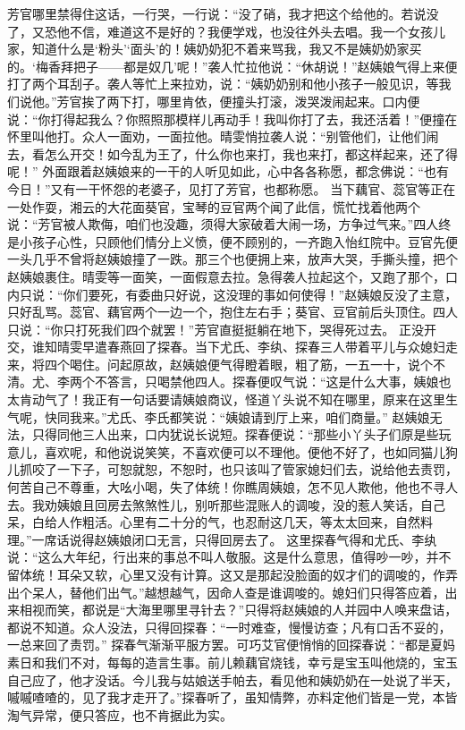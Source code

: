 \documentclass[12pt,oneside]{book}
\begin{document}
芳官哪里禁得住这话，一行哭，一行说：“没了硝，我才把这个给他的。若说没了，又恐他不信，难道这不是好的？我便学戏，也没往外头去唱。我一个女孩儿家，知道什么是‘粉头’‘面头’的！姨奶奶犯不着来骂我，我又不是姨奶奶家买的。‘梅香拜把子——都是奴几’呢！”袭人忙拉他说：“休胡说！”赵姨娘气得上来便打了两个耳刮子。袭人等忙上来拉劝，说：“姨奶奶别和他小孩子一般见识，等我们说他。”芳官挨了两下打，哪里肯依，便撞头打滚，泼哭泼闹起来。口内便说：“你打得起我么？你照照那模样儿再动手！我叫你打了去，我还活着！”便撞在怀里叫他打。众人一面劝，一面拉他。晴雯悄拉袭人说：“别管他们，让他们闹去，看怎么开交！如今乱为王了，什么你也来打，我也来打，都这样起来，还了得呢！”
外面跟着赵姨娘来的一干的人听见如此，心中各各称愿，都念佛说：“也有今日！”又有一干怀怨的老婆子，见打了芳官，也都称愿。
当下藕官、蕊官等正在一处作耍，湘云的大花面葵官，宝琴的豆官两个闻了此信，慌忙找着他两个说：“芳官被人欺侮，咱们也没趣，须得大家破着大闹一场，方争过气来。”四人终是小孩子心性，只顾他们情分上义愤，便不顾别的，一齐跑入怡红院中。豆官先便一头几乎不曾将赵姨娘撞了一跌。那三个也便拥上来，放声大哭，手撕头撞，把个赵姨娘裹住。晴雯等一面笑，一面假意去拉。急得袭人拉起这个，又跑了那个，口内只说：“你们要死，有委曲只好说，这没理的事如何使得！”赵姨娘反没了主意，只好乱骂。蕊官、藕官两个一边一个，抱住左右手；葵官、豆官前后头顶住。四人只说：“你只打死我们四个就罢！”芳官直挺挺躺在地下，哭得死过去。
正没开交，谁知晴雯早遣春燕回了探春。当下尤氏、李纨、探春三人带着平儿与众媳妇走来，将四个喝住。问起原故，赵姨娘便气得瞪着眼，粗了筋，一五一十，说个不清。尤、李两个不答言，只喝禁他四人。探春便叹气说：“这是什么大事，姨娘也太肯动气了！我正有一句话要请姨娘商议，怪道丫头说不知在哪里，原来在这里生气呢，快同我来。”尤氏、李氏都笑说：“姨娘请到厅上来，咱们商量。”
赵姨娘无法，只得同他三人出来，口内犹说长说短。探春便说：“那些小丫头子们原是些玩意儿，喜欢呢，和他说说笑笑，不喜欢便可以不理他。便他不好了，也如同猫儿狗儿抓咬了一下子，可恕就恕，不恕时，也只该叫了管家媳妇们去，说给他去责罚，何苦自己不尊重，大吆小喝，失了体统！你瞧周姨娘，怎不见人欺他，他也不寻人去。我劝姨娘且回房去煞煞性儿，别听那些混账人的调唆，没的惹人笑话，自己呆，白给人作粗活。心里有二十分的气，也忍耐这几天，等太太回来，自然料理。”一席话说得赵姨娘闭口无言，只得回房去了。
这里探春气得和尤氏、李纨说：“这么大年纪，行出来的事总不叫人敬服。这是什么意思，值得吵一吵，并不留体统！耳朵又软，心里又没有计算。这又是那起没脸面的奴才们的调唆的，作弄出个呆人，替他们出气。”越想越气，因命人查是谁调唆的。媳妇们只得答应着，出来相视而笑，都说是“大海里哪里寻针去？”只得将赵姨娘的人并园中人唤来盘诘，都说不知道。众人没法，只得回探春：“一时难查，慢慢访查；凡有口舌不妥的，一总来回了责罚。”
探春气渐渐平服方罢。可巧艾官便悄悄的回探春说：“都是夏妈素日和我们不对，每每的造言生事。前儿赖藕官烧钱，幸亏是宝玉叫他烧的，宝玉自己应了，他才没话。今儿我与姑娘送手帕去，看见他和姨奶奶在一处说了半天，嘁嘁喳喳的，见了我才走开了。”探春听了，虽知情弊，亦料定他们皆是一党，本皆淘气异常，便只答应，也不肯据此为实。
\end{document}

